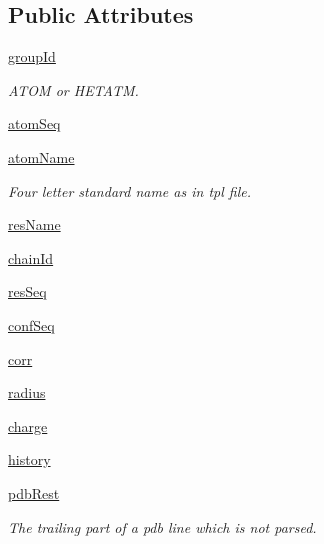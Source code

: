 \subsection*{Public Attributes}
\begin{DoxyCompactItemize}
\item 
\hyperlink{classxmccepy_1_1atom_1_1_atom_ad394fcd2eca6340dcd5d832a1bd0ec8a}{group\-Id}
\begin{DoxyCompactList}\small\item\em A\-T\-O\-M or H\-E\-T\-A\-T\-M. \end{DoxyCompactList}\item 
\hyperlink{classxmccepy_1_1atom_1_1_atom_a4c4c032cdb4a5f7e5df6f78c10d11629}{atom\-Seq}
\item 
\hyperlink{classxmccepy_1_1atom_1_1_atom_a410419d5a7bcf8e5bb504c393c03849f}{atom\-Name}
\begin{DoxyCompactList}\small\item\em Four letter standard name as in tpl file. \end{DoxyCompactList}\item 
\hyperlink{classxmccepy_1_1atom_1_1_atom_a7fe1185c33a55254824b54ef1218de51}{res\-Name}
\item 
\hyperlink{classxmccepy_1_1atom_1_1_atom_acd780de97bd09f7eba1a6f1067badbf0}{chain\-Id}
\item 
\hyperlink{classxmccepy_1_1atom_1_1_atom_a539eb962040217d58384463edbc73718}{res\-Seq}
\item 
\hyperlink{classxmccepy_1_1atom_1_1_atom_af11e5763e17aa49dd9ceeb73496a3eb5}{conf\-Seq}
\item 
\hyperlink{classxmccepy_1_1atom_1_1_atom_af3e01f96338f93fbcc67765c4d668066}{corr}
\item 
\hyperlink{classxmccepy_1_1atom_1_1_atom_af0235fff236afb4e97011731adb22f55}{radius}
\item 
\hyperlink{classxmccepy_1_1atom_1_1_atom_a75da5d014806b57f4bc26095aa5f8c80}{charge}
\item 
\hyperlink{classxmccepy_1_1atom_1_1_atom_a40df064eecfddbd9a84044c42742ca53}{history}
\item 
\hyperlink{classxmccepy_1_1atom_1_1_atom_a0ae57fea9163a481424524a4a57fb1de}{pdb\-Rest}
\begin{DoxyCompactList}\small\item\em The trailing part of a pdb line which is not parsed. \end{DoxyCompactList}\end{DoxyCompactItemize}


